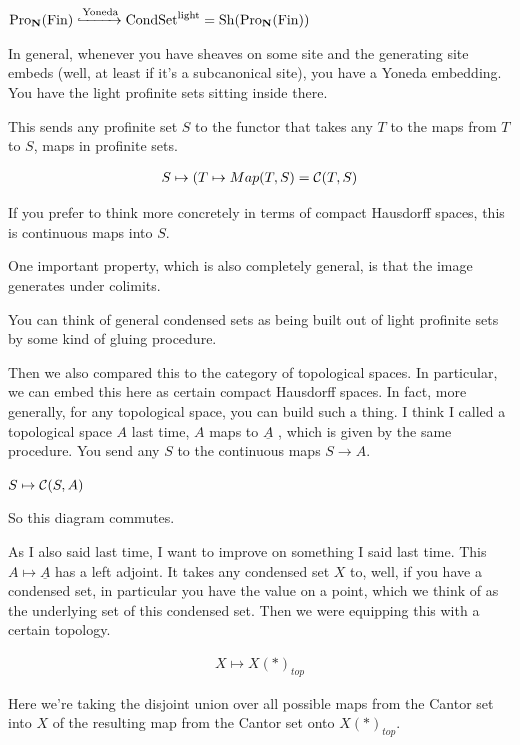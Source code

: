 $\operatorname{Pro}_{\mathbf N}(\operatorname{Fin}) \xhookrightarrow{\text{Yoneda}} \mathrm{Cond}\mathrm{Set}^{\mathrm{light}} = \operatorname{Sh}(\operatorname{Pro}_{\mathbf N}(\operatorname{Fin}))$ %



In general, whenever you have sheaves on some site and the generating site embeds (well, at least if it's a subcanonical site), you have a Yoneda embedding. 
You have the light profinite sets sitting inside there. 


This sends any profinite set $S$ to the functor that takes any $T$ to the maps from $T$ to $S$, maps in profinite sets. 

\begin{align*}
 S \mapsto (T \mapsto Map(T,S) = \Cont(T,S) %
\end{align*}


If you prefer to think more concretely in terms of compact Hausdorff spaces, this is continuous maps into $S$.

One important property, which is also completely general, is that the image generates under colimits. 

You can think of general condensed sets as being built out of light profinite sets by some kind of gluing procedure.

Then we also compared this to the category of topological spaces. In particular, we can embed this here as certain compact Hausdorff spaces. In fact, more generally, for any topological space, you can build such a thing. I think I called a topological space $A$ last time, $A$ maps to $\underline{A}$ , which is given by the same procedure. You send any $S$ to the continuous maps $S \to A$. 

$S \mapsto \mathcal{C}(S, A)$

So this diagram commutes.

As I also said last time, I want to improve on something I said last time. This $A \mapsto \underline{A}$ has a left adjoint. It takes any condensed set $X$ to, well, if you have a condensed set, in particular you have the value on a point, which we think of as the underlying set of this condensed set. 
Then we were equipping this with a certain topology.

\begin{align*}
X \mapsto X(\ast)_{top} %
\end{align*}

Here we're taking the disjoint union over all possible maps from the Cantor set into $X$ of the resulting map from the Cantor set onto $X(*)_{top}$. 

